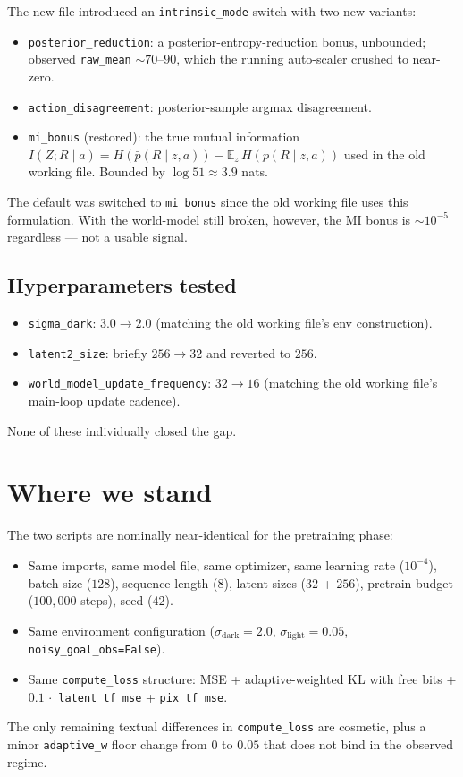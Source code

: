 \documentclass[11pt,a4paper]{article}
\begin{document}
The new file introduced an
\texttt{intrinsic\_mode} switch with two new variants:
\begin{itemize}[leftmargin=*]
  \item \texttt{posterior\_reduction}: a posterior-entropy-reduction bonus,
        unbounded; observed \texttt{raw\_mean} $\sim 70$--$90$, which the
        running auto-scaler crushed to near-zero.
  \item \texttt{action\_disagreement}: posterior-sample argmax disagreement.
  \item \texttt{mi\_bonus} (restored): the true mutual information
        $I(Z;R\mid a) = H(\bar{p}(R\mid z,a)) - \mathbb{E}_z\,H(p(R\mid z,a))$
        used in the old working file. Bounded by $\log 51 \approx 3.9$ nats.
\end{itemize}
The default was switched to \texttt{mi\_bonus} since the old working file uses
this formulation. With the world-model still broken, however, the MI bonus is
$\sim 10^{-5}$ regardless --- not a usable signal.

\subsection{Hyperparameters tested}

\begin{itemize}[leftmargin=*]
  \item \texttt{sigma\_dark}: $3.0 \to 2.0$ (matching the old working file's
        env construction).
  \item \texttt{latent2\_size}: briefly $256 \to 32$ and reverted to $256$.
  \item \texttt{world\_model\_update\_frequency}: $32 \to 16$ (matching the
        old working file's main-loop update cadence).
\end{itemize}

None of these individually closed the gap.

\section{Where we stand}

The two scripts are nominally near-identical for the pretraining phase:
\begin{itemize}[leftmargin=*]
  \item Same imports, same model file, same optimizer, same learning rate
        ($10^{-4}$), batch size ($128$), sequence length ($8$), latent sizes
        ($32$ + $256$), pretrain budget ($100{,}000$ steps), seed ($42$).
  \item Same environment configuration ($\sigma_{\mathrm{dark}}=2.0$,
        $\sigma_{\mathrm{light}}=0.05$, \texttt{noisy\_goal\_obs=False}).
  \item Same \texttt{compute\_loss} structure: MSE + adaptive-weighted KL with
        free bits + $0.1\,\cdot$ \texttt{latent\_tf\_mse} +
        \texttt{pix\_tf\_mse}.
\end{itemize}
The only remaining textual differences in \texttt{compute\_loss} are
cosmetic, plus a minor \texttt{adaptive\_w} floor change from $0$ to $0.05$
that does not bind in the observed regime.
\end{document}

